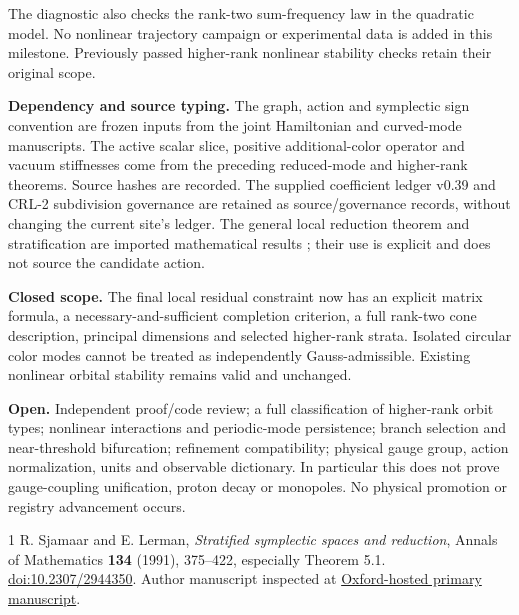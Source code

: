 \documentclass[11pt,a4paper]{article}
\begin{document}
The diagnostic also checks the rank-two sum-frequency law in the quadratic model. No nonlinear trajectory campaign or experimental data is added in this milestone. Previously passed higher-rank nonlinear stability checks retain their original scope.

\textbf{Dependency and source typing.} The graph, action and symplectic sign convention are frozen inputs from the joint Hamiltonian and curved-mode manuscripts. The active scalar slice, positive additional-color operator and vacuum stiffnesses come from the preceding reduced-mode and higher-rank theorems. Source hashes are recorded. The supplied coefficient ledger v0.39 and CRL-2 subdivision governance are retained as source/governance records, without changing the current site's ledger. The general local reduction theorem and stratification are imported mathematical results \cite{SL}; their use is explicit and does not source the candidate action.

\textbf{Closed scope.} The final local residual constraint now has an explicit matrix formula, a necessary-and-sufficient completion criterion, a full rank-two cone description, principal dimensions and selected higher-rank strata. Isolated circular color modes cannot be treated as independently Gauss-admissible. Existing nonlinear orbital stability remains valid and unchanged.

\textbf{Open.} Independent proof/code review; a full classification of higher-rank orbit types; nonlinear interactions and periodic-mode persistence; branch selection and near-threshold bifurcation; refinement compatibility; physical gauge group, action normalization, units and observable dictionary. In particular this does not prove gauge-coupling unification, proton decay or monopoles. No physical promotion or registry advancement occurs.

\begin{thebibliography}{1}
 R. Sjamaar and E. Lerman, \emph{Stratified symplectic spaces and reduction}, Annals of Mathematics \textbf{134} (1991), 375--422, especially Theorem 5.1. \href{https://doi.org/10.2307/2944350}{doi:10.2307/2944350}. Author manuscript inspected at \href{https://people.maths.ox.ac.uk/beem/papers/symplectic_stratified_spaces.pdf}{Oxford-hosted primary manuscript}.
\end{thebibliography}
\end{document}
